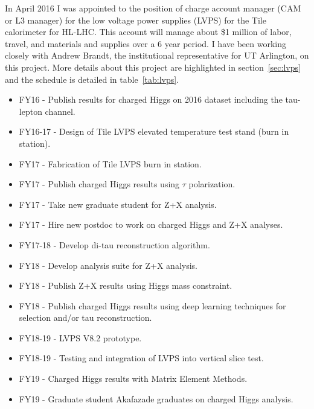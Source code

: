 In April 2016 I was appointed to the position of charge account manager (CAM or L3 manager) for the low voltage power supplies (LVPS) for the Tile calorimeter for HL-LHC.  This account will manage about \$1 million 
of labor, travel, and materials and supplies over a 6 year period.  
I have been working closely with Andrew Brandt, the institutional representative for UT Arlington, on this project.
More details about this project are highlighted in section~\ref{sec:lvps} and the schedule is detailed in table~\ref{tab:lvps}.


\begin{itemize}[noitemsep,nolistsep]
\item{FY16 - Publish results for charged Higgs on 2016 dataset including the tau-lepton channel.}
\item{FY16-17 - Design of Tile LVPS elevated temperature test stand (burn in station).}
\item{FY17 - Fabrication of Tile LVPS burn in station.}
\item{FY17 - Publish charged Higgs results using $\tau$ polarization.}
\item{FY17 - Take new graduate student for Z+X analysis.}
\item{FY17 - Hire new postdoc to work on charged Higgs and Z+X analyses.}
\item{FY17-18 - Develop di-tau reconstruction algorithm.}
\item{FY18 - Develop analysis suite for Z+X analysis.}
\item{FY18 - Publish Z+X results using Higgs mass constraint.}
\item{FY18 - Publish charged Higgs results using deep learning techniques for selection and/or tau reconstruction.}
\item{FY18-19 - LVPS V8.2 prototype.}
\item{FY18-19 - Testing and integration of LVPS into vertical slice test.}
\item{FY19 - Charged Higgs results with Matrix Element Methods.}
\item{FY19 - Graduate student Akafazade graduates on charged Higgs analysis.}
\end{itemize}

